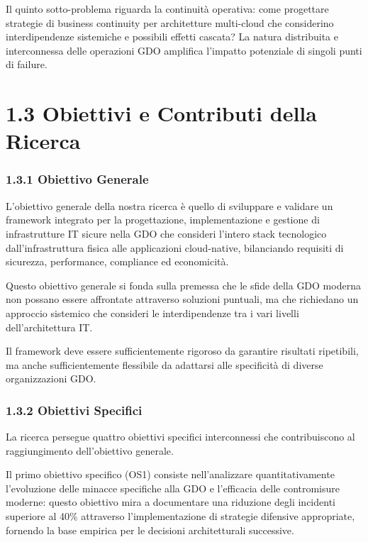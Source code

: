 \documentclass{report}
\begin{document}
Il quinto sotto-problema riguarda la continuità operativa: come
progettare strategie di business continuity per architetture multi-cloud
che considerino interdipendenze sistemiche e possibili effetti cascata?
La natura distribuita e interconnessa delle operazioni GDO amplifica
l'impatto potenziale di singoli punti di failure.

\section{\texorpdfstring{\textbf{1.3 Obiettivi e Contributi della
Ricerca}}{1.3 Obiettivi e Contributi della Ricerca}}\label{obiettivi-e-contributi-della-ricerca}

\subsubsection{\texorpdfstring{\textbf{1.3.1 Obiettivo
Generale}}{1.3.1 Obiettivo Generale}}\label{obiettivo-generale}

L'obiettivo generale della nostra ricerca è quello di sviluppare e
validare un framework integrato per la progettazione, implementazione e
gestione di infrastrutture IT sicure nella GDO che consideri l'intero
stack tecnologico dall'infrastruttura fisica alle applicazioni
cloud-native, bilanciando requisiti di sicurezza, performance,
compliance ed economicità.

Questo obiettivo generale si fonda sulla premessa che le sfide della GDO
moderna non possano essere affrontate attraverso soluzioni puntuali, ma
che richiedano un approccio sistemico che consideri le interdipendenze
tra i vari livelli dell'architettura IT.

Il framework deve essere sufficientemente rigoroso da garantire
risultati ripetibili, ma anche sufficientemente flessibile da adattarsi
alle specificità di diverse organizzazioni GDO.

\subsubsection{\texorpdfstring{\textbf{1.3.2 Obiettivi
Specifici}}{1.3.2 Obiettivi Specifici}}\label{obiettivi-specifici}

La ricerca persegue quattro obiettivi specifici interconnessi che
contribuiscono al raggiungimento dell'obiettivo generale.

Il primo obiettivo specifico (OS1) consiste nell'analizzare
quantitativamente l'evoluzione delle minacce specifiche alla GDO e
l'efficacia delle contromisure moderne: questo obiettivo mira a
documentare una riduzione degli incidenti superiore al 40\% attraverso
l'implementazione di strategie difensive appropriate, fornendo la base
empirica per le decisioni architetturali successive.
\end{document}
